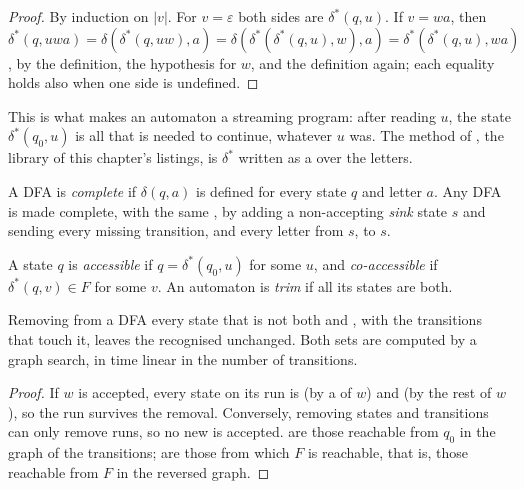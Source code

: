 \begin{proof}
By induction on $|v|$. For $v = \varepsilon$ both sides are $\delta^*(q, u)$. If $v = wa$, then $\delta^*(q, uwa) =
\delta(\delta^*(q, uw), a) = \delta(\delta^*(\delta^*(q, u), w), a) = \delta^*(\delta^*(q, u), wa)$, by the definition,
the hypothesis for $w$, and the definition again; each equality holds also when one side is undefined.
\end{proof}

This is what makes an automaton a streaming program: after reading $u$, the state $\delta^*(q_0, u)$ is all that is
needed to continue, whatever $u$ was. The  method of , the library of this
chapter's listings, is $\delta^*$ written as a  over the letters.

\begin{definition}\label{def:b2:finite-automata:complete}
A DFA is \emph{complete} if $\delta(q, a)$ is defined for every state $q$ and letter $a$.
Any DFA is made complete, with the same , by adding a non-accepting \emph{sink} state $s$ and sending every
missing transition, and every letter from $s$, to $s$.
\end{definition}

\begin{definition}\label{def:b2:finite-automata:trim}
A state $q$ is \emph{accessible} if $q = \delta^*(q_0, u)$ for some  $u$, and
\emph{co-accessible} if $\delta^*(q, v) \in F$ for some  $v$. An automaton is
\emph{trim} if all its states are both.
\end{definition}

\begin{proposition}[Trimming]\label{prop:b2:finite-automata:trim}
Removing from a DFA every state that is not both  and , with the transitions that touch it,
leaves the recognised  unchanged. Both sets are computed by a graph search, in time linear in the number of
transitions.
\end{proposition}

\begin{proof}
If $w$ is accepted, every state on its run is  (by a  of $w$) and  (by the rest of $w$),
so the run survives the removal. Conversely, removing states and transitions can only remove runs, so no new  is
accepted.  are those reachable from $q_0$ in the graph of the transitions;  are
those from which $F$ is reachable, that is, those reachable from $F$ in the reversed graph.
\end{proof}

